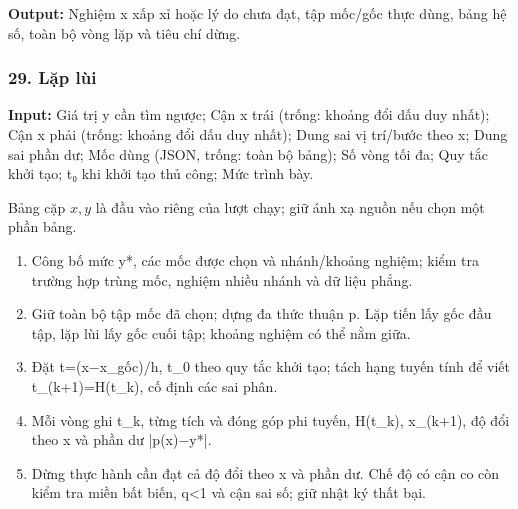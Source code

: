 \textbf{Output:} Nghiệm x xấp xỉ hoặc lý do chưa đạt,\allowbreak{} tập mốc/\allowbreak{}gốc thực dùng,\allowbreak{} bảng hệ số,\allowbreak{} toàn bộ vòng lặp và tiêu chí dừng.

\examplebreak\subsubsection*{29. Lặp lùi}

\textbf{Input:} Giá trị y cần tìm ngược;\allowbreak{} Cận x trái (\allowbreak{}trống: khoảng đổi dấu duy nhất);\allowbreak{} Cận x phải (\allowbreak{}trống: khoảng đổi dấu duy nhất);\allowbreak{} Dung sai vị trí/\allowbreak{}bước theo x;\allowbreak{} Dung sai phần dư;\allowbreak{} Mốc dùng (\allowbreak{}JSON,\allowbreak{} trống: toàn bộ bảng);\allowbreak{} Số vòng tối đa;\allowbreak{} Quy tắc khởi tạo;\allowbreak{} t₀ khi khởi tạo thủ công;\allowbreak{} Mức trình bày.

Bảng cặp $x,y$ là đầu vào riêng của lượt chạy; giữ ánh xạ nguồn nếu chọn một phần bảng.

\begin{enumerate}

\item Công bố mức y*,\allowbreak{} các mốc được chọn và nhánh/\allowbreak{}khoảng nghiệm;\allowbreak{} kiểm tra trường hợp trùng mốc,\allowbreak{} nghiệm nhiều nhánh và dữ liệu phẳng.

\item Giữ toàn bộ tập mốc đã chọn;\allowbreak{} dựng đa thức thuận p. Lặp tiến lấy gốc đầu tập,\allowbreak{} lặp lùi lấy gốc cuối tập;\allowbreak{} khoảng nghiệm có thể nằm giữa.

\item Đặt t=\allowbreak{}(\allowbreak{}x\ensuremath{-}x\_gốc)/\allowbreak{}h,\allowbreak{} t\_0 theo quy tắc khởi tạo;\allowbreak{} tách hạng tuyến tính để viết t\_(\allowbreak{}k+\allowbreak{}1)=\allowbreak{}H(\allowbreak{}t\_k),\allowbreak{} cố định các sai phân.

\item Mỗi vòng ghi t\_k,\allowbreak{} từng tích và đóng góp phi tuyến,\allowbreak{} H(\allowbreak{}t\_k),\allowbreak{} x\_(\allowbreak{}k+\allowbreak{}1),\allowbreak{} độ đổi theo x và phần dư |p(\allowbreak{}x)\ensuremath{-}y*|.

\item Dừng thực hành cần đạt cả độ đổi theo x và phần dư. Chế độ có cận co còn kiểm tra miền bất biến,\allowbreak{} q<1 và cận sai số;\allowbreak{} giữ nhật ký thất bại.

\end{enumerate}

